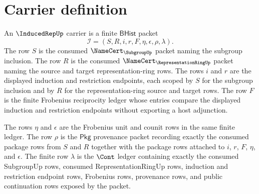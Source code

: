 \section{Carrier definition}
\label{sec:inducedrep-carrier}

\begin{definition}
\label{def:inducedrep-bhist-carrier}
An $\InducedRepUp$ carrier is a finite $\mathsf{BHist}$ packet
$$
\mathcal{I}=(S,R,i,r,F,\eta,\epsilon,\rho,\lambda).
$$
The row $S$ is the consumed $\NameCert_{\SubgroupUp}$ packet naming the
subgroup inclusion. The row $R$ is the consumed
$\NameCert_{\RepresentationRingUp}$ packet naming the source and target
representation-ring rows. The rows $i$ and $r$ are the displayed induction
and restriction endpoints, each scoped by $S$ for the subgroup inclusion and
by $R$ for the representation-ring source and target rows. The row $F$ is the
finite Frobenius reciprocity ledger whose entries compare the displayed
induction and restriction endpoints without exporting a host adjunction.

The rows $\eta$ and $\epsilon$ are the Frobenius unit and counit rows in the
same finite ledger. The row $\rho$ is the $\mathsf{Pkg}$ provenance packet
recording exactly the consumed package rows from $S$ and $R$ together with
the package rows attached to $i$, $r$, $F$, $\eta$, and $\epsilon$. The finite
row $\lambda$ is the $\Cont$ ledger containing exactly the consumed SubgroupUp
rows, consumed RepresentationRingUp rows, induction and restriction endpoint
rows, Frobenius rows, provenance rows, and public continuation rows exposed
by the packet.
\end{definition}

